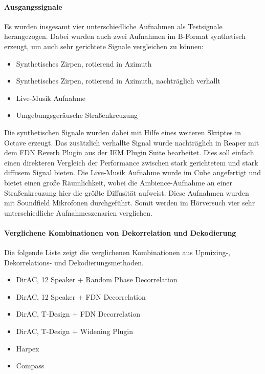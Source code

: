 \paragraph{Ausgangssignale}
Es wurden insgesamt vier unterschiedliche Aufnahmen als Testsignale herangezogen. Dabei wurden auch zwei Aufnahmen im B-Format synthetisch erzeugt, um auch sehr gerichtete Signale vergleichen zu können:

\begin{itemize}
	\item Synthetisches Zirpen, rotierend in Azimuth
	\item Synthetisches Zirpen, rotierend in Azimuth, nachträglich verhallt
	\item Live-Musik Aufnahme
	\item Umgebungsgeräusche Straßenkreuzung
\end{itemize}

Die synthetischen Signale wurden dabei mit Hilfe eines weiteren Skriptes in Octave erzeugt. Das zusätzlich verhallte Signal wurde nachträglich in Reaper mit dem FDN Reverb Plugin aus der IEM Plugin Suite bearbeitet. Dies soll einfach einen direkteren Vergleich der Performance zwischen stark gerichtetem und stark diffusem Signal bieten. Die Live-Musik Aufnahme wurde im Cube angefertigt und bietet einen große Räumlichkeit, wobei die Ambience-Aufnahme an einer Straßenkreuzung hier die größte Diffusität aufweist. Diese Aufnahmen wurden mit Soundfield Mikrofonen durchgeführt. Somit werden im Hörversuch vier sehr unterschiedliche Aufnahmeszenarien verglichen.

\paragraph{Verglichene Kombinationen von Dekorrelation und Dekodierung}

Die folgende Liste zeigt die verglichenen Kombinationen aus Upmixing-, Dekorrelations- und Dekodierungsmethoden. 

\begin{itemize}
	\item DirAC, 12 Speaker + Random Phase Decorrelation
	\item DirAC, 12 Speaker + FDN Decorrelation
	\item DirAC, T-Design + FDN Decorrelation
	\item DirAC, T-Design + Widening Plugin
	\item Harpex
	\item Compass
\end{itemize}

